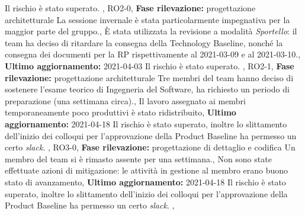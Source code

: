 {{        Il rischio è stato superato.
    },
    {
        RO2-0,
        \noexpand\textbf{Fase rilevazione:} progettazione architetturale \noexpand\newline
        La sessione invernale è stata particolarmente impegnativa per la maggior parte del gruppo.,
        È stata utilizzata la revisione a modalità \noexpand\textit{Sportello}: il team ha deciso di ritardare la consegna della Technology Baseline{,} nonché la consegna dei documenti per la RP rispettivamente al 2021-03-09 e al 2021-03-10.,
        \noexpand\textbf{Ultimo aggiornamento:} 2021-04-03 \noexpand\newline
        Il rischio è stato superato.
    },
    {
        RO2-1,
        \noexpand\textbf{Fase rilevazione:} progettazione architetturale \noexpand\newline
        Tre membri del team hanno deciso di sostenere l'esame teorico di Ingegneria del Software{,} ha richiesto un periodo di preparazione 
        (una settimana circa).,
        Il lavoro assegnato ai membri temporaneamente poco produttivi è stato ridistribuito,
        \noexpand\textbf{Ultimo aggiornamento:} 2021-04-18 \noexpand\newline
        Il rischio è stato superato{,} inoltre lo slittamento dell'inizio dei colloqui per l'approvazione della Product Baseline 
        ha permesso un certo \noexpand\textit{slack}.
    },
    {
        RO3-0,
        \noexpand\textbf{Fase rilevazione:} progettazione di dettaglio e codifica \noexpand\newline
        Un membro del team si è rimasto assente per  una settimana.,
        Non sono state effettuate azioni di mitigazione: le attività in gestione al membro erano buono stato di avanzamento,
        \noexpand\textbf{Ultimo aggiornamento:} 2021-04-18 \noexpand\newline
        Il rischio è stato superato{,} inoltre lo slittamento dell'inizio dei colloqui per l'approvazione della Product Baseline 
        ha permesso un certo \noexpand\textit{slack}.
    },
}


